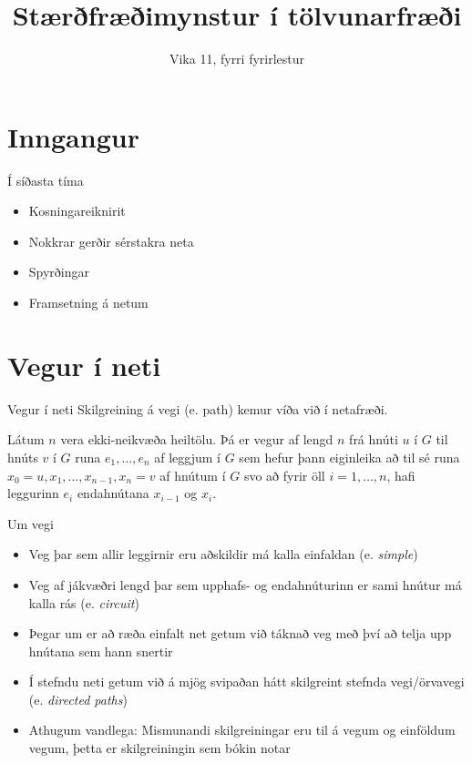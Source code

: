 \documentclass{beamer}
\title{Stærðfræðimynstur í tölvunarfræði}
\subtitle{Vika 11, fyrri fyrirlestur}
\begin{document}
\begin{frame}
\titlepage
\end{frame}


\section{Inngangur}

\begin{frame}{Í síðasta tíma}
\begin{itemize}
 \item Kosningareiknirit
 \item Nokkrar gerðir sérstakra neta
 \item Spyrðingar
 \item Framsetning á netum
\end{itemize}
\end{frame}

\section{Vegur í neti}

\begin{frame}{Vegur í neti}
Skilgreining á vegi (e.  path) kemur víða við í netafræði.

\begin{tcolorbox}[title=Vegur]
Látum $n$ vera ekki-neikvæða heiltölu. Þá er vegur af lengd $n$ frá hnúti $u$ í $G$ til hnúts $v$ í $G$ runa $e_1, \ldots, e_n$ af leggjum í $G$ sem hefur þann eiginleika að til sé runa $x_0 = u, x_1, \ldots, x_{n-1}, x_n = v$ af hnútum í $G$ svo að fyrir öll $i = 1, \ldots, n$, hafi leggurinn $e_i$ endahnútana $x_{i-1}$ og $x_i$.
\end{tcolorbox}
\end{frame}

\begin{frame}{Um vegi}
\begin{itemize}
 \item Veg þar sem allir leggirnir eru aðskildir má kalla einfaldan (e. \emph{simple})
 \item Veg af jákvæðri lengd þar sem upphafs- og endahnúturinn er sami hnútur má kalla rás (e. \emph{circuit})
 \item Þegar um er að ræða einfalt net getum við táknað veg með því að telja upp hnútana sem hann snertir
 \item Í stefndu neti getum við á mjög svipaðan hátt skilgreint stefnda vegi/örvavegi (e. \emph{directed paths})
 \item Athugum vandlega: Mismunandi skilgreiningar eru til á vegum og einföldum vegum, þetta er skilgreiningin sem bókin notar
\end{itemize}
\end{frame}
\end{document}
